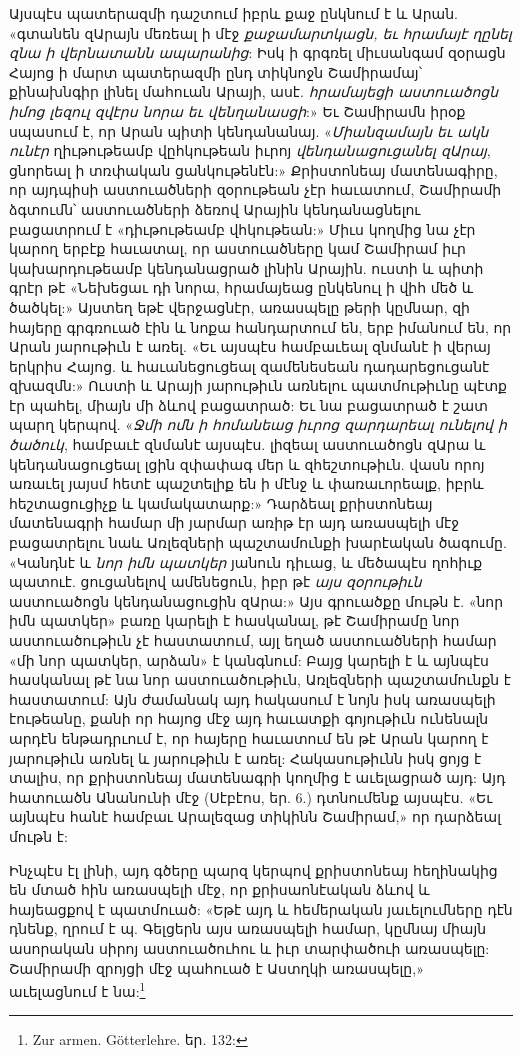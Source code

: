 \documentclass{article}
\begin{document}
{Այսպէս պատերազմի դաշտում իբրև քաջ ընկնում է և Արան. «գտանեն զԱրայն մեռեալ ի մէջ \emph{քաջամարտկացն, եւ հրամայէ ղընել զնա ի վերնատանն ապարանից}: Իսկ ի գրգռել միւսանգամ զօրացն Հայոց ի մարտ պատերազմի ընդ տիկնոջն Շամիրամայ՝ քինախնգիր լինել մահուան Արայի, ասէ. \emph{հրամայեցի աստուածոցն իմոց լեզուլ զվէրս նորա եւ վենղանասցի}:» Եւ Շամիրամն իրօք սպասում է, որ Արան պիտի կենդանանայ. «\emph{Միանզամայն եւ ակն ունէր} ղիւթութեամբ վըհկութեան իւրոյ \emph{վենդանացուցանել զԱրայ}, ցնորեալ ի տռփական ցանկութենէն:» Քրիստոնեայ մատենագիրը, որ այդպիսի աստուածների զօրութեան չէր հաւատում, Շամիրամի ձգտումն՝ աստուածների ձեռով Արային կենդանացնելու բացատրում է «դիւթութեամբ վհկութեան:» Միւս կողմից նա չէր կարող երբէք հաւատալ, որ աստուածները կամ Շամիրամ իւր կախարդութեամբ կենդանացրած լինին Արային. ուստի և պիտի գրէր թէ «Նեխեցաւ դի նորա, հրամայեաց ընկենուլ ի վիհ մեծ և ծածկել:» Այստեղ եթէ վերջացնէր, առասպելը թերի կըմնար, զի հայերը գրգռուած էին և նոքա հանդարտում են, երբ իմանում են, որ Արան յարութիւն է առել. «Եւ այսպէս համբաւեալ զնմանէ ի վերայ երկրիս Հայոց. և հաւանեցուցեալ զամենեսեան դադարեցուցանէ զխազմն:» Ուստի և Արայի յարութիւն առնելու պատմութիւնը պէտք էր պահել, միայն մի ձևով բացատրած: Եւ նա բացատրած է շատ պարղ կերպով. «\emph{Ջմի ոմն ի հոմանեաց իւրոց զարդարեալ ունելով ի ծածուկ}, համբաւէ զնմանէ այսպէս. լիզեալ աստուածոցն զԱրա և կենդանացուցեալ լցին զփափագ մեր և զհեշտութիւն. վասն որոյ առաւել յայսմ հետէ պաշտելիք են ի մէնջ և փառաւորեալք, իբրև հեշտացուցիչք և կամակատարք:» Դարձեալ քրիստոնեայ մատենագրի համար մի յարմար առիթ էր այդ առասպելի մէջ բացատրելու նաև Առլեզների պաշտամունքի խարէական ծագումը. «Կանդնէ և \emph{նոր իմն պատկեր} յանուն դիւաց, և մեծապէս ղոհիւք պատուէ. ցուցանելով ամենեցուն, իբր թէ \emph{այս զօրութիւն} աստուածոցն կենդանացուցին զԱրա:» Այս գրուածքը մութն է. «նոր իմն պատկեր» բառը կարելի է հասկանալ, թէ Շամիրամը նոր աստուածութիւն չէ հաստատում, այլ եղած աստուածների համար «մի նոր պատկեր, արձան» է կանգնում: Բայց կարելի է և այնպէս հասկանալ թէ նա նոր աստուածութիւն, Առլեզների պաշտամունքն է հաստատում: Այն ժամանակ այդ հակասում է նոյն իսկ առասպելի էութեանը, քանի որ հայոց մէջ այդ հաւատքի գոյութիւն ունենալն արդէն ենթադրւում է, որ հայերը հաւատում են թէ Արան կարող է յարութիւն առնել և յարութիւն է առել: Հակասութիւնն իսկ ցոյց է տալիս, որ քրիստոնեայ մատենագրի կողմից է աւելացրած այդ: Այդ հատուածն Անանունի մէջ (Սէբէոս, եր. 6.) դտնումենք այսպէս. «Եւ այնպէս հանէ համբաւ Արալեզաց տիկինն Շամիրամ,» որ դարձեալ մութն է:

Ինչպէս էլ լինի, այդ գծերը պարզ կերպով քրիստոնեայ հեղինակից են մտած հին առասպելի մէջ, որ քրիսաոնէական ձևով և հայեացքով է պատմուած: «Եթէ այդ և հեմերական յաւելումները դէն դնենք, ղրում է պ. Գելցերն այս առասպելի համար, կըմնայ միայն ասորական սիրոյ աստուածուհու և իւր տարփածուի առասպելը: Շամիրամի զրոյցի մէջ պահուած է Աստղկի առասպելը,» աւելացնում է նա:\footnote{Zur armen. Götterlehre. եր. 132:}

}
\end{document}
